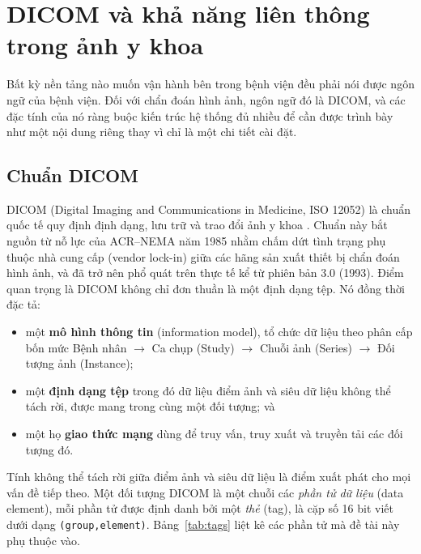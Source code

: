 \section{DICOM và khả năng liên thông trong ảnh y khoa}
\label{sec:dicom}

Bất kỳ nền tảng nào muốn vận hành bên trong bệnh viện đều phải nói được ngôn ngữ
của bệnh viện. Đối với chẩn đoán hình ảnh, ngôn ngữ đó là DICOM, và các đặc tính
của nó ràng buộc kiến trúc hệ thống đủ nhiều để cần được trình bày như một nội
dung riêng thay vì chỉ là một chi tiết cài đặt.

\subsection{Chuẩn DICOM}

DICOM (Digital Imaging and Communications in Medicine, ISO 12052) là chuẩn quốc
tế quy định định dạng, lưu trữ và trao đổi ảnh y khoa \cite{dicom2024,pianykh2012dicom}. Chuẩn này bắt nguồn từ nỗ
lực của ACR--NEMA năm 1985 nhằm chấm dứt tình trạng phụ thuộc nhà cung cấp
(vendor lock-in) giữa các hãng sản xuất thiết bị chẩn đoán hình ảnh, và đã trở
nên phổ quát trên thực tế kể từ phiên bản 3.0 (1993). Điểm quan trọng là DICOM
không chỉ đơn thuần là một định dạng tệp. Nó đồng thời đặc tả:

\begin{itemize}
    \item một \textbf{mô hình thông tin} (information model), tổ chức dữ liệu
          theo phân cấp bốn mức Bệnh nhân $\rightarrow$ Ca chụp (Study)
          $\rightarrow$ Chuỗi ảnh (Series) $\rightarrow$ Đối tượng ảnh
          (Instance);
    \item một \textbf{định dạng tệp} trong đó dữ liệu điểm ảnh và siêu dữ liệu
          không thể tách rời, được mang trong cùng một đối tượng; và
    \item một họ \textbf{giao thức mạng} dùng để truy vấn, truy xuất và truyền
          tải các đối tượng đó.
\end{itemize}

Tính không thể tách rời giữa điểm ảnh và siêu dữ liệu là điểm xuất phát cho mọi
vấn đề tiếp theo. Một đối tượng DICOM là một chuỗi các \emph{phần tử dữ liệu}
(data element), mỗi phần tử được định danh bởi một \emph{thẻ} (tag), là cặp số
16 bit viết dưới dạng \texttt{(group,element)}. Bảng~\ref{tab:tags} liệt kê các
phần tử mà đề tài này phụ thuộc vào.

